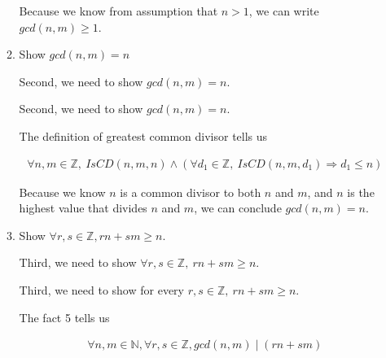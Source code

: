 \documentclass[12pt]{article}
\begin{document}
\begin{enumerate}[a.]
\begin{mdframed}
\begin{enumerate}[1.]
\begin{mdframed}
            \bigskip

            Because we know from assumption that $n > 1$, we can write
            $gcd(n,m) \geq 1$.
            \end{mdframed}

            \item Show $gcd(n,m) = n$

            \bigskip

            Second, we need to show $gcd(n,m) = n$.

            \begin{mdframed}
                Second, we need to show $gcd(n,m) = n$.

                \bigskip

                The definition of greatest common divisor tells us

                \begin{align}
                    \forall n,m \in \mathbb{Z},\:IsCD(n,m,n) \land (\forall d_1 \in \mathbb{Z},\: IsCD(n,m,d_1) \Rightarrow d_1 \leq n)
                \end{align}

                \bigskip

                Because we know $n$ is a common divisor to both $n$ and $m$, and $n$
                is the highest value that divides $n$ and $m$, we can conclude
                $gcd(n,m) = n$.

            \end{mdframed}

            \item Show $\forall r,s \in \mathbb{Z}, rn + sm \geq n$.

            \bigskip

            Third, we need to show $\forall r,s \in \mathbb{Z},\:rn + sm \geq n$.

            \bigskip

            \begin{mdframed}

            Third, we need to show for every $r,s \in \mathbb{Z},\:rn + sm \geq n$.

            \bigskip

            The fact 5 tells us

            \begin{align}
                \forall n,m \in \mathbb{N}, \forall r,s \in \mathbb{Z}, gcd(n,m) \mid (rn + sm)
            \end{align}


\end{mdframed}
\end{enumerate}
\end{mdframed}
\end{enumerate}
\end{document}
